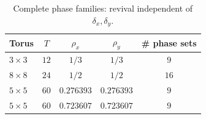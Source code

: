 \begin{table}[h]
\centering
\caption{Complete phase families: revival independent of
$\delta_x,\delta_y$.}
\label{tab:complete-phase-disc}
\begin{tabular}{lcccc}
\toprule
Torus & $T$ & $\rho_x$ & $\rho_y$ & \# phase sets \\
\midrule
$3\times3$ & $12$ & $1/3$ & $1/3$ & $9$ \\
$8\times8$ & $24$ & $1/2$ & $1/2$ & $16$ \\
$5\times5$ & $60$ & $0.276393$ & $0.276393$ & $9$ \\
$5\times5$ & $60$ & $0.723607$ & $0.723607$ & $9$ \\
\bottomrule
\end{tabular}
\end{table}
